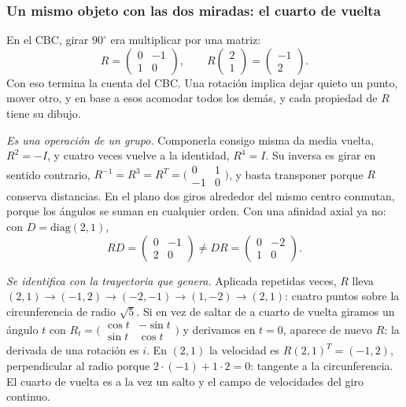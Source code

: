 \subsubsection*{Un mismo objeto con las dos miradas: el cuarto de vuelta}

En el CBC, girar \(90^\circ\) era multiplicar por una matriz:
\[
  R=\begin{pmatrix}0&-1\\1&0\end{pmatrix},\qquad
  R\begin{pmatrix}2\\1\end{pmatrix}=\begin{pmatrix}-1\\2\end{pmatrix}.
\]
Con eso termina la cuenta del CBC. Una rotación implica dejar quieto un
punto, mover otro, y en base a esos acomodar todos los demás, y
cada propiedad de \(R\) tiene su dibujo.

\emph{Es una operación de un grupo.} Componerla consigo misma da media vuelta,
\(R^2=-I\), y cuatro veces vuelve a la identidad, \(R^4=I\). Su inversa es girar en sentido
contrario, \(R^{-1}=R^3=R^T=\bigl(\begin{smallmatrix}0&1\\-1&0\end{smallmatrix}\bigr)\), y
basta transponer porque \(R\) conserva distancias. En el plano dos giros alrededor del mismo
centro conmutan, porque los ángulos se suman en cualquier orden. Con una afinidad axial ya
no: con \(D=\mathrm{diag}(2,1)\),
\[
  RD=\begin{pmatrix}0&-1\\2&0\end{pmatrix}\neq
  DR=\begin{pmatrix}0&-2\\1&0\end{pmatrix}.
\]

\emph{Se identifica con la trayectoria que genera.} Aplicada repetidas veces, \(R\) lleva
\((2,1)\to(-1,2)\to(-2,-1)\to(1,-2)\to(2,1)\): cuatro puntos sobre la circunferencia de
radio \(\sqrt5\). Si en vez de saltar de a cuarto de vuelta giramos un ángulo \(t\) con
\(R_t=\bigl(\begin{smallmatrix}\cos t&-\sin t\\ \sin t&\cos t\end{smallmatrix}\bigr)\) y
derivamos en \(t=0\), aparece de nuevo \(R\): la derivada de una
rotación es \(i\). En \((2,1)\) la velocidad es \(R(2,1)^T=(-1,2)\),
perpendicular al radio porque \(2\cdot(-1)+1\cdot2=0\): tangente a la circunferencia. El
cuarto de vuelta es a la vez un salto y el campo de velocidades del giro continuo.

